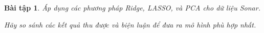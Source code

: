 \documentclass[14pt, a4paper]{article}
\theoremstyle{sltheorem}
\newtheorem{baitap}{Bài tập}
\theoremstyle{soltheorem}
\begin{document}
\begin{titlepage}





    \vfill %

\end{titlepage}

\nocite{*}

\newpage

\begin{baitap}
    Áp dụng các phương pháp Ridge, LASSO, và PCA cho dữ liệu Sonar.

    Hãy so sánh các kết quả thu được và biện luận để đưa ra mô hình phù hợp nhất.
\end{baitap}
\end{document}
